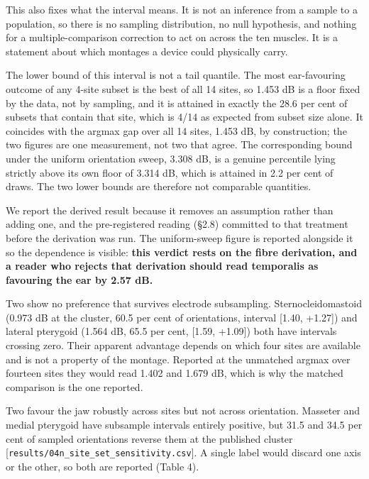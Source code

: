 \documentclass[
  11pt,
  a4paper,
]{article}
\begin{document}
This also fixes what the interval means. It is not an inference from a sample to
a population, so there is no sampling distribution, no null hypothesis, and
nothing for a multiple-comparison correction to act on across the ten muscles.
It is a statement about which montages a device could physically carry.

The lower bound of this interval is not a tail quantile. The most ear-favouring
outcome of any 4-site subset is the best of all 14 sites, so \textminus{}1.453 dB is a
floor fixed by the data, not by sampling, and it is attained in exactly the 28.6
per cent of subsets that contain that site, which is 4/14 as expected from
subset size alone. It coincides with the argmax gap over all 14 sites, \textminus{}1.453
dB, by construction; the two figures are one measurement, not two that agree.
The corresponding bound under the uniform orientation sweep, \textminus{}3.308 dB, is a
genuine percentile lying strictly above its own floor of \textminus{}3.314 dB, which is
attained in 2.2 per cent of draws. The two lower bounds are therefore not
comparable quantities.

We report the derived result because it removes an assumption rather than
adding one, and the pre-registered reading (\S{}2.8) committed to that treatment
before the derivation was run. The uniform-sweep figure is reported alongside
it so the dependence is visible: \textbf{this verdict rests on the fibre derivation,
and a reader who rejects that derivation should read temporalis as favouring
the ear by 2.57 dB.}

Two show no preference that survives electrode subsampling.
Sternocleidomastoid (\textminus{}0.973 dB at the cluster, 60.5 per cent of orientations,
interval {[}\textminus{}1.40, +1.27{]}) and lateral pterygoid (\textminus{}1.564 dB, 65.5 per cent,
{[}\textminus{}1.59, +1.09{]}) both have intervals crossing zero. Their apparent advantage
depends on which four sites are available and is not a property of the
montage. Reported at the unmatched argmax over fourteen sites they would read
\textminus{}1.402 and \textminus{}1.679 dB, which is why the matched comparison is the one reported.

Two favour the jaw robustly across sites but not across orientation.
Masseter and medial pterygoid have subsample intervals entirely positive, but
31.5 and 34.5 per cent of sampled orientations reverse them at the published
cluster {[}\texttt{results/04n\_site\_set\_sensitivity.csv}{]}. A single label would discard
one axis or the other, so both are reported (Table 4).
\end{document}
